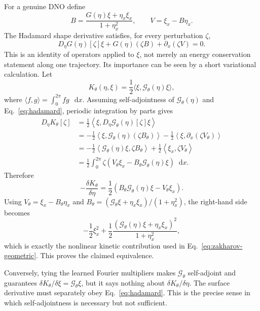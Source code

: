 \documentclass[11pt]{article}
\newcommand{\Gt}{\mathcal{G}_{\theta}}
\newcommand{\dd}{\mathop{}\!\mathrm{d}}
\newcommand{\inner}[2]{\left\langle #1,#2\right\rangle}
\newcommand{\Deta}{D_{\eta}}
\begin{document}
For a genuine DNO define
\begin{equation}
 B=\frac{G(\eta)\xi+\eta_x\xi_x}{1+\eta_x^2},
 \qquad V=\xi_x-B\eta_x.
\end{equation}
The Hadamard shape derivative satisfies, for every perturbation \(\zeta\),
\begin{equation}
 D_\eta G(\eta)[\zeta]\xi
 +G(\eta)(\zeta B)
 +\partial_x(\zeta V)=0.
 \label{eq:hadamard}
\end{equation}
This is an identity of operators applied to \(\xi\), not merely an energy
conservation statement along one trajectory.  Its importance can be seen by a
short variational calculation.  Let
\begin{equation}
 K_\theta(\eta,\xi)=\frac{1}{2}\langle\xi,\Gt(\eta)\xi\rangle,
\end{equation}
where \(\langle f,g\rangle=\int_0^{2\pi}fg\,\dd x\).  Assuming
self-adjointness of \(\Gt(\eta)\) and Eq.~\eqref{eq:hadamard}, periodic
integration by parts gives
\begin{align}
 \Deta K_\theta[\zeta]
 &=\frac12\inner{\xi}{\Deta\Gt(\eta)[\zeta]\xi} \\
 &=-\frac12\inner{\xi}{\Gt(\eta)(\zeta B_\theta)}
   -\frac12\inner{\xi}{\partial_x(\zeta V_\theta)} \\
 &=-\frac12\inner{\Gt(\eta)\xi}{\zeta B_\theta}
   +\frac12\inner{\xi_x}{\zeta V_\theta} \\
 &=\frac12\int_0^{2\pi}\zeta
       \left(V_\theta\xi_x-B_\theta\Gt(\eta)\xi\right)\dd x.
 \label{eq:kinetic-variation}
\end{align}
Therefore
\begin{equation}
 -\frac{\delta K_\theta}{\delta\eta}
 =\frac12\left(B_\theta\Gt(\eta)\xi-V_\theta\xi_x\right).
 \label{eq:kinetic-gradient}
\end{equation}
Using \(V_\theta=\xi_x-B_\theta\eta_x\) and
\(B_\theta=(\Gt\xi+\eta_x\xi_x)/(1+\eta_x^2)\), the right-hand side becomes
\begin{equation}
 -\frac12\xi_x^2
 +\frac12\frac{(\Gt(\eta)\xi+\eta_x\xi_x)^2}{1+\eta_x^2},
\end{equation}
which is exactly the nonlinear kinetic contribution used in
Eq.~\eqref{eq:zakharov-geometric}.  This proves the claimed equivalence.

Conversely, tying the learned Fourier multipliers makes \(\Gt\) self-adjoint
and guarantees \(\delta K_\theta/\delta\xi=\Gt\xi\), but it says nothing about
\(\delta K_\theta/\delta\eta\).  The surface derivative must separately obey
Eq.~\eqref{eq:hadamard}.  This is the precise sense in which self-adjointness is
necessary but not sufficient.
\end{document}
